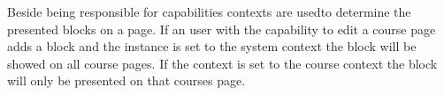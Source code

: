 Beside being responsible for capabilities contexts are usedto determine the presented blocks on a page. If an user with the capability to edit a course page adds a block and the instance is set to the system context the block will be showed on all course pages. If the context is set to the course context the block will only be presented on that courses page. 

	
	
	